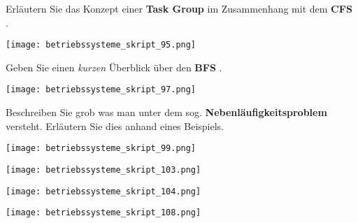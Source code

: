\documentclass{article}
\begin{document}
\begin{tcolorbox}[colback=white!10!white,colframe=lightgray!75!black,
  savelowerto=\jobname_ex.tex,breakable,enhanced,lines before break=40]

\begin{center}
Erläutern Sie das Konzept einer 
\textbf{Task Group
} im Zusammenhang mit dem 
\textbf{CFS
}.

\end{center}

\tcblower

\justifying
\begin{center}
\texttt{[image: betriebssysteme\_skript\_95.png]}
\end{center}

\end{tcolorbox}
\begin{tcolorbox}[colback=white!10!white,colframe=lightgray!75!black,
  savelowerto=\jobname_ex.tex,breakable,enhanced,lines before break=40]

\begin{center}
Geben Sie einen 
\textit{kurzen
} Überblick über den 
\textbf{BFS
}.

\end{center}

\tcblower

\justifying
\begin{center}
\texttt{[image: betriebssysteme\_skript\_97.png]}
\end{center}

\end{tcolorbox}
\begin{tcolorbox}[colback=white!10!white,colframe=lightgray!75!black,
  savelowerto=\jobname_ex.tex,breakable,enhanced,lines before break=40]

\begin{center}
Beschreiben Sie grob was man unter dem sog. 
\textbf{Nebenläufigkeitsproblem
} versteht. Erläutern Sie dies anhand eines Beispiels.

\end{center}

\tcblower

\justifying
\begin{center}
\texttt{[image: betriebssysteme\_skript\_99.png]}
\end{center}
\begin{center}
\texttt{[image: betriebssysteme\_skript\_103.png]}
\end{center}
\begin{center}
\texttt{[image: betriebssysteme\_skript\_104.png]}
\end{center}
\begin{center}
\texttt{[image: betriebssysteme\_skript\_108.png]}
\end{center}

\end{tcolorbox}
\end{document}
